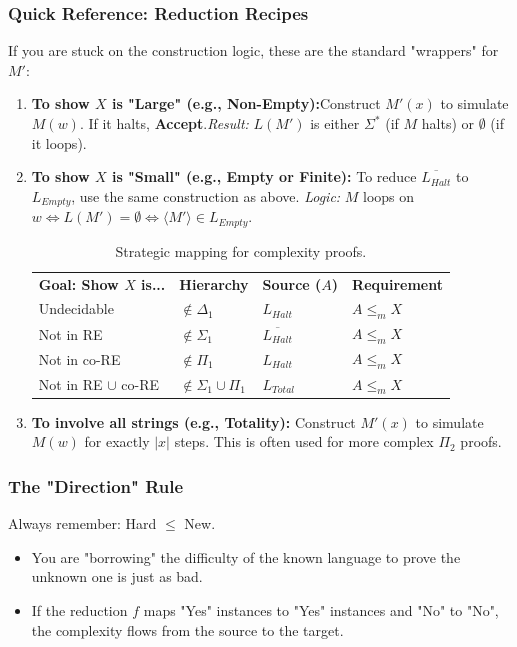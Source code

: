 \documentclass{article}
\begin{document}
\subsubsection*{Quick Reference: Reduction Recipes}If you are stuck on the construction logic, these are the standard "wrappers" for $M'$:\begin{enumerate}\item \textbf{To show $X$ is "Large" (e.g., Non-Empty):}Construct $M'(x)$ to simulate $M(w)$. If it halts, \textbf{Accept}.\textit{Result:} $L(M')$ is either $\Sigma^*$ (if $M$ halts) or $\emptyset$ (if it loops).\item \textbf{To show $X$ is "Small" (e.g., Empty or Finite):}
To reduce $\overline{L_{Halt}}$ to $L_{Empty}$, use the same construction as above. 
\textit{Logic:} $M$ loops on $w \iff L(M') = \emptyset \iff \langle M' \rangle \in L_{Empty}$.
\begin{table}[h]
\centering
\renewcommand{\arraystretch}{1.5}
\setlength{\tabcolsep}{10pt}
\begin{tabular}{llll}
\textbf{Goal: Show $X$ is...} & \textbf{Hierarchy} & \textbf{Source ($A$)} & \textbf{Requirement} \\ 
Undecidable                   & $\notin \Delta_1$  & $L_{Halt}$            & $A \leq_m X$         \\
Not in RE                     & $\notin \Sigma_1$  & $\overline{L_{Halt}}$ & $A \leq_m X$         \\
Not in co-RE                  & $\notin \Pi_1$     & $L_{Halt}$            & $A \leq_m X$         \\
Not in RE $\cup$ co-RE        & $\notin \Sigma_1 \cup \Pi_1$ & $L_{Total}$ & $A \leq_m X$         \\
\end{tabular}
\caption{Strategic mapping for complexity proofs.}
\end{table}
\item \textbf{To involve all strings (e.g., Totality):}
Construct $M'(x)$ to simulate $M(w)$ for exactly $|x|$ steps. This is often used for more complex $\Pi_2$ proofs.
\end{enumerate}\subsubsection*{The "Direction" Rule}Always remember: Hard $\leq$ New.\begin{itemize}\item You are "borrowing" the difficulty of the known language to prove the unknown one is just as bad.\item If the reduction $f$ maps "Yes" instances to "Yes" instances and "No" to "No", the complexity flows from the source to the target.\end{itemize}
\end{document}
